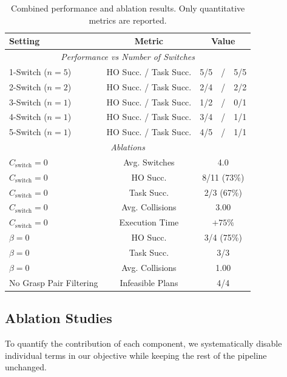\begin{table}[h]
\centering
\caption{Combined performance and ablation results. Only quantitative metrics are reported.}
\label{tab:combined_results}
\begin{tabular}{lcc}
\hline
\textbf{Setting} & \textbf{Metric} & \textbf{Value} \\
\hline

\multicolumn{3}{c}{\textit{Performance vs Number of Switches}} \\
1-Switch ($n=5$) & HO Succ. / Task Succ. & 5/5~~/~~5/5 \\
2-Switch ($n=2$) & HO Succ. / Task Succ. & 2/4~~/~~2/2 \\
3-Switch ($n=1$) & HO Succ. / Task Succ. & 1/2~~/~~0/1 \\
4-Switch ($n=1$) & HO Succ. / Task Succ. & 3/4~~/~~1/1 \\
5-Switch ($n=1$) & HO Succ. / Task Succ. & 4/5~~/~~1/1 \\

\hline
\multicolumn{3}{c}{\textit{Ablations}} \\
$C_{\text{switch}} = 0$ & Avg. Switches & 4.0 \\
$C_{\text{switch}} = 0$ & HO Succ. & 8/11 (73\%) \\
$C_{\text{switch}} = 0$ & Task Succ. & 2/3 (67\%) \\
$C_{\text{switch}} = 0$ & Avg. Collisions & 3.00 \\
$C_{\text{switch}} = 0$ & Execution Time & $+75\%$ \\

$\beta = 0$ & HO Succ. & 3/4 (75\%) \\
$\beta = 0$ & Task Succ. & 3/3 \\
$\beta = 0$ & Avg. Collisions & 1.00 \\

No Grasp Pair Filtering & Infeasible Plans & 4/4 \\

\hline
\end{tabular}
\end{table}


\subsection{Ablation Studies}

To quantify the contribution of each component, we systematically disable individual terms in our objective while keeping the rest of the pipeline unchanged.

